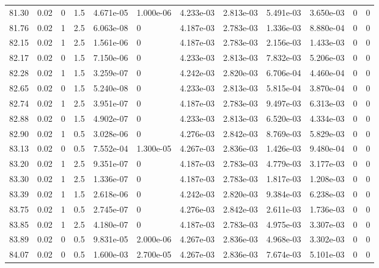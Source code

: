 \documentclass[preview]{standalone}
\begin{document}
{{{{{{{{{{{{\begin{tabular}{L{1.2cm}C{1.2cm} C{0.3cm}C{0.5cm} C{1.4cm}C{1.4cm} C{1.4cm}C{1.4cm} C{1.6cm}C{1.6cm} C{1.6cm}C{1.6cm}}
  81.30  &  0.02  & 0     & 1.5 &  4.671e-05  & 1.000e-06  &  4.233e-03&   2.813e-03& 5.491e-03 & 3.650e-03   &  0 & 0  \\ 
  81.76  &  0.02  & 1     & 2.5 &  6.063e-08  & 0  &  4.187e-03&   2.783e-03& 1.336e-03 & 8.880e-04   &  0 & 0  \\ 
  82.15  &  0.02  & 1     & 2.5 &  1.561e-06  & 0  &  4.187e-03&   2.783e-03& 2.156e-03 & 1.433e-03   &  0 & 0  \\ 
  82.17  &  0.02  & 0     & 1.5 &  7.150e-06  & 0  &  4.233e-03&   2.813e-03& 7.832e-03 & 5.206e-03   &  0 & 0  \\ 
  82.28  &  0.02  & 1     & 1.5 &  3.259e-07  & 0  &  4.242e-03&   2.820e-03& 6.706e-04 & 4.460e-04   &  0 & 0  \\ 
  82.65  &  0.02  & 0     & 1.5 &  5.240e-08  & 0  &  4.233e-03&   2.813e-03& 5.815e-04 & 3.870e-04   &  0 & 0  \\ 
  82.74  &  0.02  & 1     & 2.5 &  3.951e-07  & 0  &  4.187e-03&   2.783e-03& 9.497e-03 & 6.313e-03   &  0 & 0  \\ 
  82.88  &  0.02  & 0     & 1.5 &  4.902e-07  & 0  &  4.233e-03&   2.813e-03& 6.520e-03 & 4.334e-03   &  0 & 0  \\ 
  82.90  &  0.02  & 1     & 0.5 &  3.028e-06  & 0  &  4.276e-03&   2.842e-03& 8.769e-03 & 5.829e-03   &  0 & 0  \\ 
  83.13  &  0.02  & 0     & 0.5 &  7.552e-04  & 1.300e-05  &  4.267e-03&   2.836e-03& 1.426e-03 & 9.480e-04   &  0 & 0  \\ 
  83.20  &  0.02  & 1     & 2.5 &  9.351e-07  & 0  &  4.187e-03&   2.783e-03& 4.779e-03 & 3.177e-03   &  0 & 0  \\ 
  83.30  &  0.02  & 1     & 2.5 &  1.336e-07  & 0  &  4.187e-03&   2.783e-03& 1.817e-03 & 1.208e-03   &  0 & 0  \\ 
  83.39  &  0.02  & 1     & 1.5 &  2.618e-06  & 0  &  4.242e-03&   2.820e-03& 9.384e-03 & 6.238e-03   &  0 & 0  \\ 
  83.75  &  0.02  & 1     & 0.5 &  2.745e-07  & 0  &  4.276e-03&   2.842e-03& 2.611e-03 & 1.736e-03   &  0 & 0  \\ 
  83.85  &  0.02  & 1     & 2.5 &  4.180e-07  & 0  &  4.187e-03&   2.783e-03& 4.975e-03 & 3.307e-03   &  0 & 0  \\ 
  83.89  &  0.02  & 0     & 0.5 &  9.831e-05  & 2.000e-06  &  4.267e-03&   2.836e-03& 4.968e-03 & 3.302e-03   &  0 & 0  \\ 
  84.07  &  0.02  & 0     & 0.5 &  1.600e-03  & 2.700e-05  &  4.267e-03&   2.836e-03& 7.674e-03 & 5.101e-03   &  0 & 0  \\ 

\end{tabular}}}}}}}}}}}}}
\end{document}
